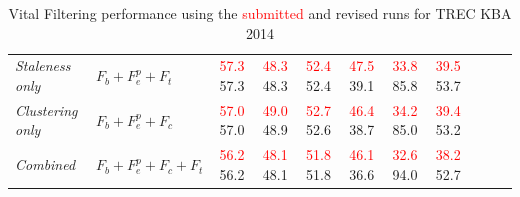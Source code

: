 \documentclass{article}
\newcommand{\sub}[1]{\textcolor{red}{#1}}
\begin{document}
\begin{table}[tb]
{\begin{center}
\begin{tabular}{llccccccccc}
{\textit{Staleness only}} & $F_b+F_e^p+F_t$ & 
  \sub{57.3} \hspace{1mm} 57.3 & \sub{48.3} \hspace{1mm} 48.3 & \sub{52.4} \hspace{1mm} 52.4 &
  \sub{47.5} \hspace{1mm} 39.1 & \sub{33.8} \hspace{1mm} 85.8 & \sub{39.5} \hspace{1mm} 53.7 \\
{\textit{Clustering only}} & $F_b+F_e^p+F_c$ & 
  \sub{57.0} \hspace{1mm} 57.0 & \sub{49.0} \hspace{1mm} 48.9 & \sub{52.7} \hspace{1mm} 52.6 &
  \sub{46.4} \hspace{1mm} 38.7 & \sub{34.2} \hspace{1mm} 85.0 & \sub{39.4} \hspace{1mm} 53.2 \\
{\textit{Combined}} & $F_b+F_e^p+F_c+F_t$ &
  \sub{56.2} \hspace{1mm} 56.2 & \sub{48.1} \hspace{1mm} 48.1 & \sub{51.8} \hspace{1mm} 51.8 &
  \sub{46.1} \hspace{1mm} 36.6 & \sub{32.6} \hspace{1mm} 94.0 & \sub{38.2} \hspace{1mm} 52.7 \\
 
\bottomrule
\end{tabular}
\end{center}
}
\caption{Vital Filtering performance using the \sub{submitted} and revised runs for TREC KBA 2014}
\label{officialRes}
\end{table}
\end{document}
